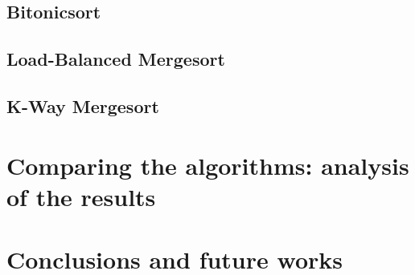 \documentclass[a4paper,12pt,oneside,openright]{article}
\begin{document}
\subsection{Bitonicsort}
\subsection{Load-Balanced Mergesort}
\subsection{K-Way Mergesort}

\section{Comparing the algorithms: analysis of the results}

\section{Conclusions and future works}


                                                                    

%



\pagebreak



\end{document}
